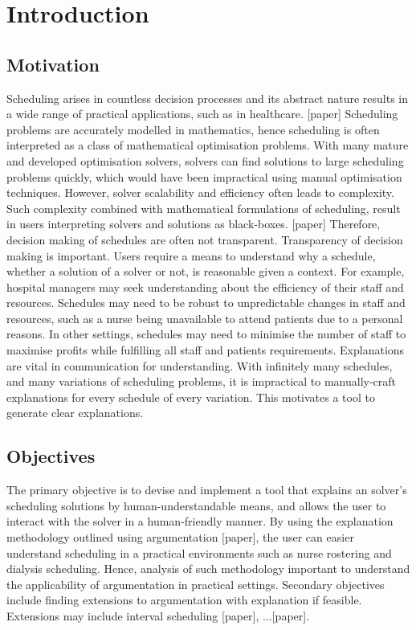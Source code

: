 \chapter{Introduction}
	
\section{Motivation}

Scheduling arises in countless decision processes and its abstract nature results in a wide range of practical applications, such as in healthcare. [paper] Scheduling problems are accurately modelled in mathematics, hence scheduling is often interpreted as a class of mathematical optimisation problems. With many mature and developed optimisation solvers, solvers can find solutions to large scheduling problems quickly, which would have been impractical using manual optimisation techniques. However, solver scalability and efficiency often leads to complexity. Such complexity combined with mathematical formulations of scheduling, result in users interpreting solvers and solutions as black-boxes. [paper] Therefore, decision making of schedules are often not transparent.
\linespace
Transparency of decision making is important. Users require a means to understand why a schedule, whether a solution of a solver or not, is reasonable given a context. For example, hospital managers may seek understanding about the efficiency of their staff and resources. Schedules may need to be robust to unpredictable changes in staff and resources, such as a nurse being unavailable to attend patients due to a personal reasons. In other settings, schedules may need to minimise the number of staff to maximise profits while fulfilling all staff and patients requirements.
\linespace
Explanations are vital in communication for understanding. With infinitely many schedules, and many variations of scheduling problems, it is impractical to manually-craft explanations for every schedule of every variation. This motivates a tool to generate clear explanations.

\section{Objectives}

The primary objective is to devise and implement a tool that explains an solver's scheduling solutions by human-understandable means, and allows the user to interact with the solver in a human-friendly manner. By using the explanation methodology outlined using argumentation [paper], the user can easier understand scheduling in a practical environments such as nurse rostering and dialysis scheduling. Hence, analysis of such methodology important to understand the applicability of argumentation in practical settings.
\linespace
Secondary objectives include finding extensions to argumentation with explanation if feasible. Extensions may include interval scheduling [paper], ...[paper].

